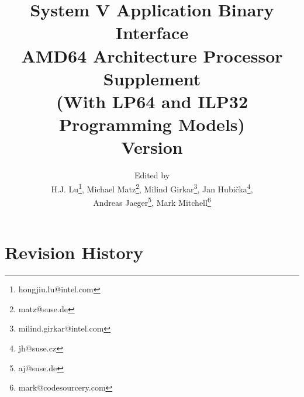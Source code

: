 \documentclass[12pt]{report}
\begin{document}
\author{Edited by\\
  H.J. Lu\thanks{hongjiu.lu@intel.com},
  Michael Matz\thanks{matz@suse.de},
  Milind Girkar\thanks{milind.girkar@intel.com},
  Jan Hubi\v{c}ka\thanks{jh@suse.cz},\\
  Andreas Jaeger\thanks{aj@suse.de},
  Mark Mitchell\thanks{mark@codesourcery.com}}

\title{System V Application Binary Interface\\
{\Large AMD64 Architecture Processor Supplement\\
(With LP64 and ILP32 Programming Models)\\
Version \version}}
\maketitle
\tableofcontents
\listoftables
\listoffigures

\section*{Revision History}
\end{document}
